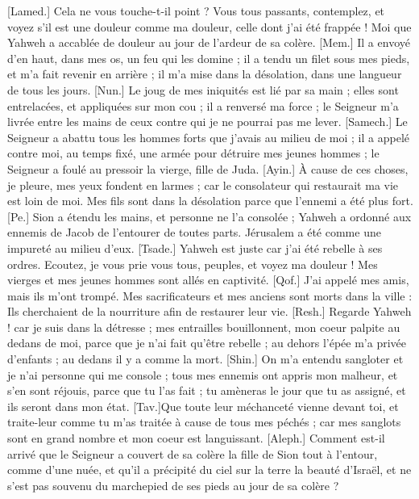 \begin{multicols}{2}
[Lamed.] Cela ne vous touche-t-il point ? Vous tous passants, contemplez, et voyez s'il est une douleur comme ma douleur, celle dont j'ai été frappée ! Moi que Yahweh a accablée de douleur au jour de l'ardeur de sa colère.
[Mem.] Il a envoyé d'en haut, dans mes os, un feu qui les domine ; il a tendu un filet sous mes pieds, et m'a fait revenir en arrière ; il m'a mise dans la désolation, dans une langueur de tous les jours.
[Nun.] Le joug de mes iniquités est lié par sa main ; elles sont entrelacées, et appliquées sur mon cou ; il a renversé ma force ; le Seigneur m'a livrée entre les mains de ceux contre qui je ne pourrai pas me lever.
[Samech.] Le Seigneur a abattu tous les hommes forts que j'avais au milieu de moi ; il a appelé contre moi, au temps fixé, une armée pour détruire mes jeunes hommes ; le Seigneur a foulé au pressoir la vierge, fille de Juda.
[Ayin.] À cause de ces choses, je pleure, mes yeux fondent en larmes ; car le consolateur qui restaurait ma vie est loin de moi. Mes fils sont dans la désolation parce que l'ennemi a été plus fort.
[Pe.] Sion a étendu les mains, et personne ne l'a consolée ; Yahweh a ordonné aux ennemis de Jacob de l'entourer de toutes parts. Jérusalem a été comme une impureté au milieu d'eux.
[Tsade.] Yahweh est juste car j'ai été rebelle à ses ordres. Ecoutez, je vous prie vous tous, peuples, et voyez ma douleur ! Mes vierges et mes jeunes hommes sont allés en captivité.
[Qof.] J'ai appelé mes amis, mais ils m'ont trompé. Mes sacrificateurs et mes anciens sont morts dans la ville : Ils cherchaient de la nourriture afin de restaurer leur vie.
[Resh.] Regarde Yahweh ! car je suis dans la détresse ; mes entrailles bouillonnent, mon coeur palpite au dedans de moi, parce que je n'ai fait qu'être rebelle ; au dehors l’épée m’a privée d’enfants ; au dedans il y a comme la mort. 
[Shin.] On m'a entendu sangloter et je n'ai personne qui me console ; tous mes ennemis ont appris mon malheur, et s’en sont réjouis, parce que tu l’as fait ; tu amèneras le jour que tu as assigné, et ils seront dans mon état.
[Tav.]Que toute leur méchanceté vienne devant toi, et traite-leur comme tu m'as traitée à cause de tous mes péchés ; car mes sanglots sont en grand nombre et mon coeur est languissant. 
\VerseOne{}[Aleph.] Comment est-il arrivé que le Seigneur a couvert de sa colère la fille de Sion tout à l'entour, comme d'une nuée, et qu'il a précipité du ciel sur la terre la beauté d'Israël, et ne s'est pas souvenu du marchepied de ses pieds au jour de sa colère ?

\end{multicols}
